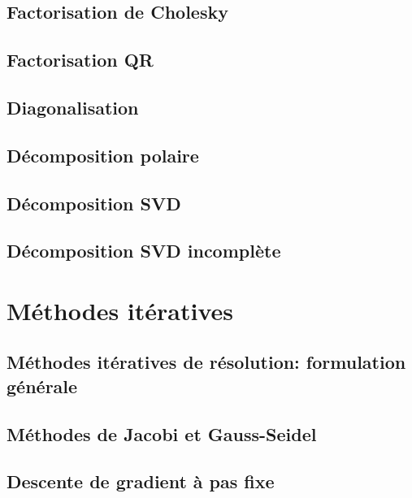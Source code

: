 \subsection{Factorisation de Cholesky}

\subsection{Factorisation QR}


\subsection{Diagonalisation}

\subsection{Décomposition polaire}

\subsection{Décomposition SVD}

\subsection{Décomposition SVD incomplète}


\section{Méthodes itératives}

\subsection{Méthodes itératives de résolution: formulation générale}

\subsection{Méthodes de Jacobi et Gauss-Seidel}

\subsection{Descente de gradient à pas fixe}

